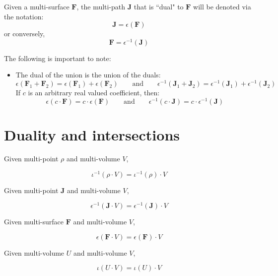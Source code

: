 Given a multi-surface \(\mathbf{F}\), the multi-path \(\mathbf{J}\) that is ``dual" to \(\mathbf{F}\) will be denoted via the notation:
\[\mathbf{J} = \epsilon(\mathbf{F})\]
or conversely, 
\[\mathbf{F} = \epsilon^{-1}(\mathbf{J})\]

The following is important to note:
\begin{itemize}
\item The dual of the union is the union of the duals:
\[\epsilon(\mathbf{F}_1 + \mathbf{F}_2) = \epsilon(\mathbf{F}_1) + \epsilon(\mathbf{F}_2)
\quad\quad\text{and}\quad\quad
\epsilon^{-1}(\mathbf{J}_1 + \mathbf{J}_2) = \epsilon^{-1}(\mathbf{J}_1) + \epsilon^{-1}(\mathbf{J}_2)\]
If \(c\) is an arbitrary real valued coefficient, then:
\[\epsilon(c \cdot \mathbf{F}) = c \cdot \epsilon(\mathbf{F})
\quad\quad\text{and}\quad\quad
\epsilon^{-1}(c \cdot \mathbf{J}) = c \cdot \epsilon^{-1}(\mathbf{J})\]
\end{itemize}



\section{Duality and intersections}

\begin{thm}
Given multi-point \(\rho\) and multi-volume \(V\), 

\[\iota^{-1}(\rho \cdot V) = \iota^{-1}(\rho) \cdot V\]

Given multi-point \(\mathbf{J}\) and multi-volume \(V\), 

\[\epsilon^{-1}(\mathbf{J} \cdot V) = \epsilon^{-1}(\mathbf{J}) \cdot V\]

Given multi-surface \(\mathbf{F}\) and multi-volume \(V\), 

\[\epsilon(\mathbf{F} \cdot V) = \epsilon(\mathbf{F}) \cdot V\]

Given multi-volume \(U\) and multi-volume \(V\), 

\[\iota(U \cdot V) = \iota(U) \cdot V\]
\end{thm}


